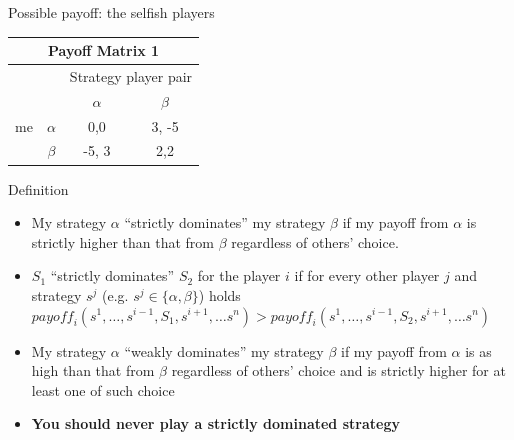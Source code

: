 \documentclass{beamer}
\begin{document}
\begin{frame}{Possible payoff: the selfish players}
\begin{center}
  \begin{tabular}{|c|c|c|c|}
    \hline
    \multicolumn{4}{|c|}{Payoff Matrix 1}\\
    \hline
 &
&
\multicolumn{2}{|c|}{Strategy player pair}\\
    \hline
 & 
     & $\alpha$ & $\beta$  \\
    \hline
me & $\alpha$
     & 0,0 & 3, -5 \\
    \hline
 & $\beta$
     & -5, 3 & 2,2 \\
    \hline
  \end{tabular}
\end{center}
\end{frame}

\begin{frame}{Definition}
  \begin{itemize}
  \item My strategy $\alpha$ ``strictly dominates'' my strategy
    $\beta$ if my payoff from $\alpha$ is strictly higher than that 
    from $\beta$ regardless of others' choice.
  \item<2-> $S_1$ ``strictly dominates'' $S_2$ for the player $i$ if
    for every other player $j$ and strategy $s^j$ (e.g.  $s^j \in \{\alpha, \beta\}$) holds
    $\textit{payoff}_i(s^1, \dots, s^{i-1}, S_1, s^{i+1}, \dots s^n) >
    \textit{payoff}_i(s^1, \dots, s^{i-1}, S_2, s^{i+1}, \dots s^n)$
  \item<3-> My strategy $\alpha$ ``weakly dominates'' my strategy
    $\beta$ if my payoff from $\alpha$ is as high than that 
    from $\beta$ regardless of others' choice and is strictly higher
    for at least one of such choice
  \item<4-> \textbf{You should never play a strictly dominated strategy}
  \end{itemize}
\end{frame}
\end{document}
